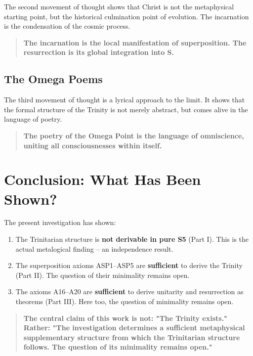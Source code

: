 \documentclass[
]{article}
\begin{document}
The second movement of thought shows that Christ is not the metaphysical starting point, but the historical culmination point of evolution. The incarnation is the condensation of the cosmic process.

\begin{quote}
\textbf{The incarnation is the local manifestation of superposition. The resurrection is its global integration into S.}
\end{quote}

\subsection{The Omega Poems}

The third movement of thought is a lyrical approach to the limit. It shows that the formal structure of the Trinity is not merely abstract, but comes alive in the language of poetry.

\begin{quote}
\textbf{The poetry of the Omega Point is the language of omniscience, uniting all consciousnesses within itself.}
\end{quote}

\section{Conclusion: What Has Been Shown?}

The present investigation has shown:

\begin{enumerate}
\item The Trinitarian structure is \textbf{not derivable in pure S5} (Part I). This is the actual metalogical finding – an independence result.
\item The superposition axioms ASP1–ASP5 are \textbf{sufficient} to derive the Trinity (Part II). The question of their minimality remains open.
\item The axioms A16–A20 are \textbf{sufficient} to derive unitarity and resurrection as theorems (Part III). Here too, the question of minimality remains open.
\end{enumerate}

\begin{quote}
\textbf{The central claim of this work is not: "The Trinity exists." Rather: "The investigation determines a sufficient metaphysical supplementary structure from which the Trinitarian structure follows. The question of its minimality remains open."}
\end{quote}
\end{document}
